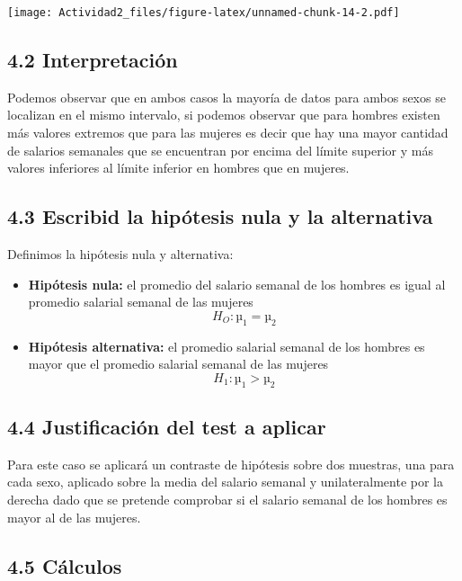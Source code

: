 \documentclass[
  a4paper]{article}
\providecommand{\tightlist}{%
  \setlength{\itemsep}{0pt}\setlength{\parskip}{0pt}}
\begin{document}
\texttt{[image: Actividad2\_files/figure-latex/unnamed-chunk-14-2.pdf]}

\hypertarget{interpretaciuxf3n}{%
\subsection{4.2 Interpretación}\label{interpretaciuxf3n}}

Podemos observar que en ambos casos la mayoría de datos para ambos sexos
se localizan en el mismo intervalo, si podemos observar que para hombres
existen más valores extremos que para las mujeres es decir que hay una
mayor cantidad de salarios semanales que se encuentran por encima del
límite superior y más valores inferiores al límite inferior en hombres
que en mujeres.

\hypertarget{escribid-la-hipuxf3tesis-nula-y-la-alternativa-1}{%
\subsection{4.3 Escribid la hipótesis nula y la
alternativa}\label{escribid-la-hipuxf3tesis-nula-y-la-alternativa-1}}

Definimos la hipótesis nula y alternativa:

\begin{itemize}
\tightlist
\item
  \textbf{Hipótesis nula:} el promedio del salario semanal de los
  hombres es igual al promedio salarial semanal de las mujeres
  \[H_O: µ_1 = µ_2\]
\item
  \textbf{Hipótesis alternativa:} el promedio salarial semanal de los
  hombres es mayor que el promedio salarial semanal de las mujeres
  \[H_1: µ_1 > µ_2\]
\end{itemize}

\hypertarget{justificaciuxf3n-del-test-a-aplicar-1}{%
\subsection{4.4 Justificación del test a
aplicar}\label{justificaciuxf3n-del-test-a-aplicar-1}}

Para este caso se aplicará un contraste de hipótesis sobre dos muestras,
una para cada sexo, aplicado sobre la media del salario semanal y
unilateralmente por la derecha dado que se pretende comprobar si el
salario semanal de los hombres es mayor al de las mujeres.

\hypertarget{cuxe1lculos-1}{%
\subsection{4.5 Cálculos}\label{cuxe1lculos-1}}
\end{document}
